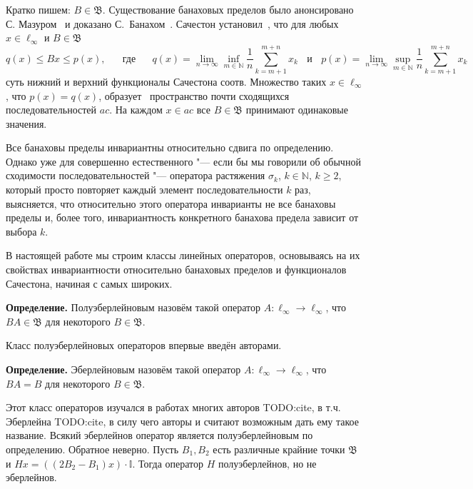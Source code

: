 \documentclass[a4paper,14pt]{article}
\begin{document}
Кратко пишем: $B \in \mathfrak{B}$.
Существование банаховых пределов было анонсировано С. Мазуром~\cite{Mazur} и доказано С.~Банахом~\cite{banach1993theorie}.
Сачестон установил~\cite{sucheston1967banach}, что
для любых $x\in \ell_\infty$ и $B\in\mathfrak{B}$
\begin{equation*}\label{Sucheston}
	q(x) \leqslant Bx \leqslant p(x)
	,
	\quad\mbox{~~где~~}\quad
	q(x) = \lim_{n\to\infty} \inf_{m\in\mathbb{N}}  \frac{1}{n} \sum_{k=m+1}^{m+n} x_k
	~~~~\mbox{и}~~~~
	p(x) = \lim_{n\to\infty} \sup_{m\in\mathbb{N}}  \frac{1}{n} \sum_{k=m+1}^{m+n} x_k
\end{equation*}
суть нижний и верхний функционалы Сачестона соотв.
Множество таких $x\in\ell_\infty$, что $p(x)=q(x)$,
образует~\cite{lorentz1948contribution} пространство почти сходящихся последовательностей $ac$.
На каждом $x\in ac$ все $B\in \mathfrak{B}$ принимают одинаковые значения.

Все банаховы пределы инвариантны относительно сдвига по определению.
Однако уже для совершенно естественного "--- если бы мы говорили об обычной сходимости последовательностей "---
оператора растяжения $\sigma_k$, $k\in \mathbb N$, $k\ge2$, который просто повторяет каждый элемент последовательности $k$ раз,
выясняется, что относительно этого оператора инварианты не все банаховы пределы и,
более того, инвариантность конкретного банахова предела зависит от выбора $k$.

В настоящей работе мы строим классы линейных операторов,
основываясь на их свойствах инвариантности относительно банаховых пределов и функционалов Сачестона,
начиная с самых широких.

\textbf{Определение.}
Полуэберлейновым назовём такой оператор $A:\ell_\infty \to \ell_\infty$,
что $BA\in\mathfrak B$ для некоторого $B\in\mathfrak B$.

Класс полуэберлейновых операторов впервые введён авторами.

\textbf{Определение.}
Эберлейновым назовём такой оператор $A:\ell_\infty \to \ell_\infty$,
что $BA=B$ для некоторого $B\in\mathfrak B$.

Этот класс операторов изучался в работах многих авторов
TODO:cite,
в т.ч. Эберлейна
TODO:cite,
в силу чего авторы и считают возможным дать ему такое название.
%
Всякий эберлейнов оператор является полуэберлейновым по определению.
Обратное неверно.
	Пусть $B_1, B_2$ есть различные крайние точки $ \mathfrak B$
	и $Hx = ((2B_2-B_1) x) \cdot\mathbb I$.
	Тогда оператор $H$ полуэберлейнов,
	но не эберлейнов.
\end{document}
